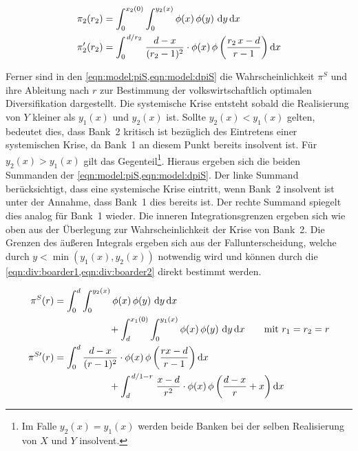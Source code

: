 \begin{align}
	\pi_2(r_2)  & = \int_0^{x_2(0)} \int_0^{y_2(x)} \phi(x)\,\phi(y)\ \dd y\, \dd x                                             \label{eqn:model:pi2}  \\
	\pi'_2(r_2) & = \int_0^{\flatfrac{d}{r_2}} \frac{d-x}{(r_2-1)^2} \cdot \phi(x)\,\phi\left(\frac{r_2\,x-d}{r-1}\right) \dd x \label{eqn:model:dpi2}
\end{align}

Ferner sind in den \cref{eqn:model:piS,eqn:model:dpiS} die Wahrscheinlichkeit $\pi^{S}$ und ihre Ableitung nach $r$ zur Bestimmung der volkswirtschaftlich optimalen Diversifikation dargestellt. Die systemische Krise entsteht sobald die Realisierung von $Y$ kleiner als $y_1(x)$ und $y_2(x)$ ist. Sollte $y_2(x)\!<\!y_1(x)$ gelten, bedeutet dies, dass Bank~2 kritisch ist bezüglich des Eintretens einer systemischen Krise, da Bank~1 an diesem Punkt bereits insolvent ist. Für $y_2(x)\!>\!y_1(x)$ gilt das Gegenteil\footnote{Im Falle $y_2(x)\!=\!y_1(x)$ werden beide Banken bei der selben Realisierung von $X$ und $Y$ insolvent.}. Hieraus ergeben sich die beiden Summanden der \cref{eqn:model:piS,eqn:model:dpiS}. Der linke Summand berücksichtigt, dass eine systemische Krise eintritt, wenn Bank~2 insolvent ist unter der Annahme, dass Bank~1 dies bereits ist. Der rechte Summand spiegelt dies analog für Bank~1 wieder. Die inneren Integrationsgrenzen ergeben sich wie oben aus der Überlegung zur Wahrscheinlichkeit der Krise von Bank~2. Die Grenzen des äußeren Integrals ergeben sich aus der Fallunterscheidung, welche durch $y<\min\left(y_1(x), y_2(x)\right)$ notwendig wird und können durch die \cref{eqn:div:boarder1,eqn:div:boarder2} direkt bestimmt werden.

\begin{align}
	\pi^{S}(r)       & = \int_0^{d} \int_0^{y_2(x)} \phi(x)\,\phi(y)\ \dd y\, \dd x \notag                                                                      \\
	                 & \hspace{2cm} + \int_d^{x_1(0)} \int_0^{y_1(x)} \phi(x)\,\phi(y)\ \dd y\, \dd x \qquad \text{mit } r_1=r_2=r		 \label{eqn:model:piS}        \\
	\pi^{S\prime}(r) & = \int_0^{d} \frac{d-x}{(r-1)^2} \cdot \phi(x)\,\phi\left(\frac{rx-d}{r-1}\right) \dd x \notag                                           \\
	                 & \hspace{2cm} + \int_d^{\flatfrac{d}{1-r}} \frac{x-d}{r^2} \cdot \phi(x)\,\phi\left(\frac{d-x}{r} + x\right) \dd x \label{eqn:model:dpiS}
\end{align}


